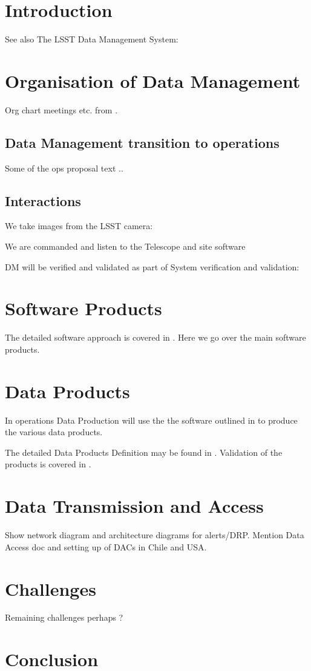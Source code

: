 \section{Introduction}

 See also The LSST Data Management System: \cite{2015arXiv151207914J}






\section{Organisation of Data Management} \label{sec:org}
Org chart meetings etc. from \cite{LDM-294}.
\subsection{ Data Management transition to operations} \label{sec:org}
Some of the ops proposal text ..

\subsection{Interactions}
   We take images from the  LSST camera: \cite{2010SPIE.7735E..0JK}

   We are commanded and listen to the  Telescope  and site software  \cite{2014SPIE.9145E..1AG}


   DM will be verified and validated as part of System verification and validation: \cite{2014SPIE.9150E..0NS}
\section {Software Products} \label{sec:softproduts}
The detailed software approach is covered in \cite{PSTN-019}. Here we go over the main software products.


\section{Data Products} \label{sec:dataproducts}
In operations Data Production will use the the software outlined in  to produce the various data products.

 The detailed  Data Products Definition may be found in  \cite{LSE-163}.
Validation of the products is covered in \cite{PSTN-024}.


\section {Data Transmission and  Access } \label{sec:dataacess}
Show network diagram and architecture diagrams for alerts/DRP. Mention Data Access doc  \cite{LDO-013} and
setting up of DACs in Chile and USA.

\section {Challenges }
Remaining challenges perhaps ?

\section{Conclusion}
